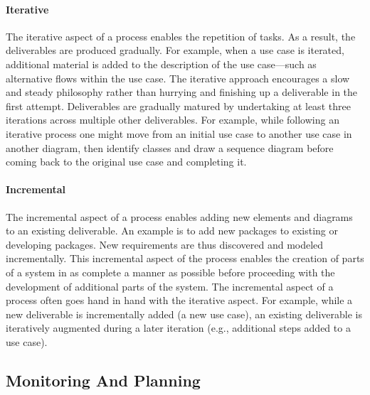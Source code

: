 \paragraph*{Iterative}
The iterative aspect of a process enables the repetition of tasks. As a result, the deliverables are produced gradually. For example, when a use case is iterated, additional material is added to the description of the use case—such as alternative flows within the use case. The iterative approach encourages a slow and steady philosophy rather than hurrying and finishing up a deliverable in the first attempt.
Deliverables are gradually matured by undertaking at least three iterations across multiple other deliverables. For example, while following an iterative process one might move from an initial use case to another use case in another diagram, then identify classes and draw a sequence diagram before coming back to the original use case and completing it.

\paragraph*{Incremental}
The incremental aspect of a process enables adding new elements and diagrams to an existing deliverable. An example is to add new packages to existing or developing packages. New requirements are thus discovered and modeled incrementally. This incremental aspect of the process enables the creation of parts of a system in as complete a manner as possible before proceeding with the development of additional parts of the system. The incremental aspect of a process often goes hand in hand with the iterative aspect. For example, while a new deliverable is incrementally added (a new use case), an existing deliverable is iteratively augmented during a later iteration (e.g., additional steps added to a use case).

\subsection{Monitoring And Planning}

